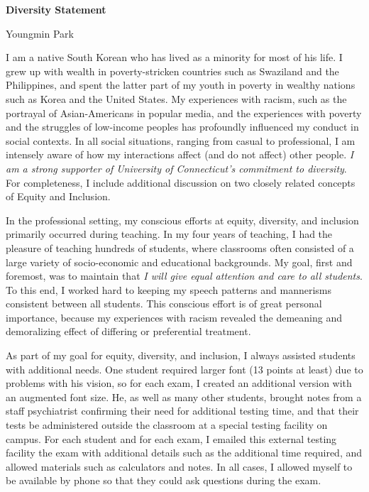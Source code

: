 \documentclass[a4paper,11pt]{article}
\begin{document}
\begin{center}
\Large \textbf{Diversity Statement}

\Large Youngmin Park
\end{center}

I am a native South Korean who has lived as a minority for most of his life. I grew up with wealth in poverty-stricken countries such as Swaziland and the Philippines, and spent the latter part of my youth in poverty in wealthy nations such as Korea and the United States. My experiences with racism, such as the portrayal of Asian-Americans in popular media, and the experiences with poverty and the struggles of low-income peoples has profoundly influenced my conduct in social contexts. In all social situations, ranging from casual to professional, I am intensely aware of how my interactions affect (and do not affect) other people. \textit{I am a strong supporter of University of Connecticut's commitment to diversity}. For completeness, I include additional discussion on two closely related concepts of Equity and Inclusion.

In the professional setting, my conscious efforts at equity, diversity, and inclusion primarily occurred during teaching. In my four years of teaching, I had the pleasure of teaching hundreds of students, where classrooms often consisted of a large variety of socio-economic and educational backgrounds. My goal, first and foremost, was to maintain that \textit{I will give equal attention and care to all students}. To this end, I worked hard to keeping my speech patterns and mannerisms consistent between all students. This conscious effort is of great personal importance, because my experiences with racism revealed the demeaning and demoralizing effect of differing or preferential treatment.

As part of my goal for equity, diversity, and inclusion, I always assisted students with additional needs. One student required larger font (13 points at least) due to problems with his vision, so for each exam, I created an additional version with an augmented font size. He, as well as many other students, brought notes from a staff psychiatrist confirming their need for additional testing time, and that their tests be administered outside the classroom at a special testing facility on campus. For each student and for each exam, I emailed this external testing facility the exam with additional details such as the additional time required, and allowed materials such as calculators and notes. In all cases, I allowed myself to be available by phone so that they could ask questions during the exam.
\end{document}
